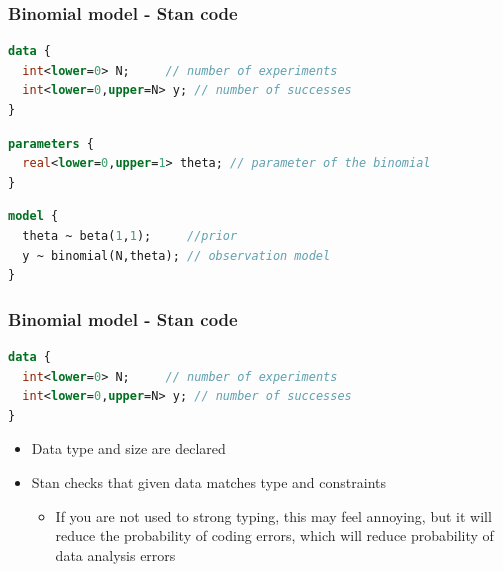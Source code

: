 \documentclass[10pt,handout]{beamer}
\begin{document}
\begin{frame}[fragile]

\frametitle{Binomial model - Stan code}
  {\small\color{gray}
{
  \begin{lstlisting}[language=Stan,basicstyle=\ttfamily]
data {
  int<lower=0> N;     // number of experiments
  int<lower=0,upper=N> y; // number of successes
}
\end{lstlisting}}
  {
\begin{lstlisting}[language=Stan]
parameters {
  real<lower=0,upper=1> theta; // parameter of the binomial
}
\end{lstlisting}}
{
\begin{lstlisting}[language=Stan]
model {
  theta ~ beta(1,1);     //prior
  y ~ binomial(N,theta); // observation model
}
\end{lstlisting}
}}
\end{frame}

\begin{frame}[fragile]

\frametitle{Binomial model - Stan code}

  {\small
  \begin{lstlisting}[language=Stan]
data {
  int<lower=0> N;     // number of experiments
  int<lower=0,upper=N> y; // number of successes
}
\end{lstlisting}}

  \begin{itemize}
  \item Data type and size are declared
  \item Stan checks that given data matches type and constraints
    \begin{itemize}
    \item<2-> If you are not used to strong typing, this may
      feel annoying, but it will reduce the probability of coding
      errors, which will reduce probability of data analysis errors
    \end{itemize}
  \end{itemize}
\end{frame}
\end{document}
